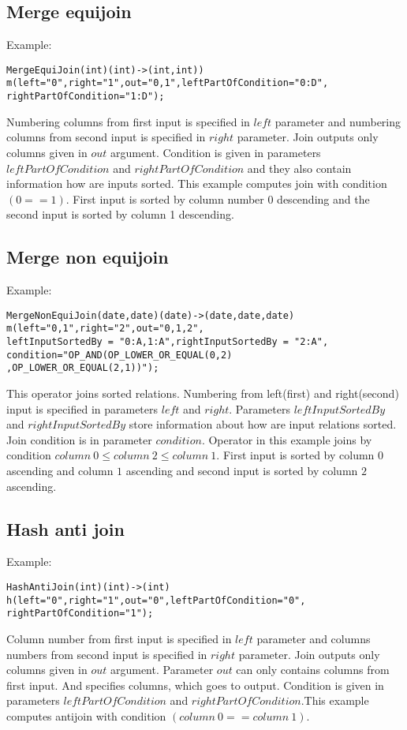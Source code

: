 \subsection{Merge equijoin}
Example:
\begin{lstlisting}
MergeEquiJoin(int)(int)->(int,int))
m(left="0",right="1",out="0,1",leftPartOfCondition="0:D",
rightPartOfCondition="1:D");
\end{lstlisting}
Numbering columns from first input is specified in $left$ parameter and numbering columns from second input is specified in $right$ parameter. Join outputs only columns given in $out$ argument. Condition is given in parameters $leftPartOfCondition$ and $rightPartOfCondition$ and they also contain information how are inputs sorted. This example computes join with condition $(0==1)$. First input is sorted by column number 0 descending and the second input is sorted by column 1 descending.

\subsection{Merge non equijoin}
Example:
\begin{lstlisting}
MergeNonEquiJoin(date,date)(date)->(date,date,date)
m(left="0,1",right="2",out="0,1,2",
leftInputSortedBy = "0:A,1:A",rightInputSortedBy = "2:A",
condition="OP_AND(OP_LOWER_OR_EQUAL(0,2)
,OP_LOWER_OR_EQUAL(2,1))");
\end{lstlisting}

This operator joins sorted relations. Numbering from left(first) and right(second) input is specified in parameters $left$ and $right$. Parameters $leftInputSortedBy$ and $rightInputSortedBy$ store information about how are input relations sorted. Join condition is in parameter $condition$. Operator in this example joins by condition $column~0 \leq column~2\leq column~1$. First input is sorted by column $0$ ascending and column $1$ ascending and second input is sorted by column $2$ ascending.

\subsection{Hash anti join}
Example:
\begin{lstlisting}
HashAntiJoin(int)(int)->(int)
h(left="0",right="1",out="0",leftPartOfCondition="0",
rightPartOfCondition="1"); 
\end{lstlisting}

Column number from first input is specified in $left$ parameter and columns numbers from second input is specified in $right$ parameter. Join outputs only columns given in $out$ argument. Parameter $out$ can only contains columns from first input. And specifies columns, which goes to output. Condition is given in parameters $leftPartOfCondition$ and $rightPartOfCondition$.This example computes antijoin with condition $(column~0==column~1)$.

